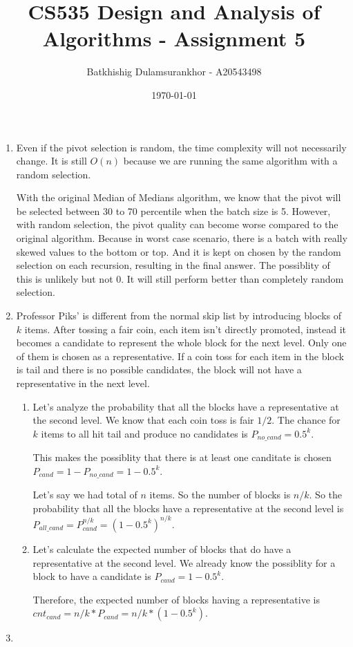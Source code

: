 \documentclass{article}
\title{CS535 Design and Analysis of Algorithms - Assignment 5}
\author{Batkhishig Dulamsurankhor - A20543498}
\date{\today} %
\begin{document}
\maketitle

\begin{enumerate}
  \item Even if the pivot selection is random, the time complexity will not necessarily change.
  It is still $O(n)$ because we are running the same algorithm with a random selection.

  With the original Median of Medians algorithm, we know that the pivot will be selected between 30 to 70 percentile when the batch size is 5.
  However, with random selection, the pivot quality can become worse compared to the original algorithm.
  Because in worst case scenario, there is a batch with really skewed values to the bottom or top.
  And it is kept on chosen by the random selection on each recursion, resulting in the final answer.
  The possiblity of this is unlikely but not 0.
  It will still perform better than completely random selection.

  \item Professor Piks' is different from the normal skip list by introducing blocks of $k$ items.
  After tossing a fair coin, each item isn't directly promoted, instead it becomes a candidate to represent the whole block for the next level.
  Only one of them is chosen as a representative.
  If a coin toss for each item in the block is tail and there is no possible candidates, the block will not have a representative in the next level.

  \begin{enumerate}
    \item Let's analyze the probability that all the blocks have a representative at the second level.
    We know that each coin toss is fair $1/2$.
    The chance for $k$ items to all hit tail and produce no candidates is $P_{no\_cand}=0.5^k$.
  
    This makes the possiblity that there is at least one canditate is chosen $P_{cand}=1-P_{no\_cand}=1-0.5^k$.
  
    Let's say we had total of $n$ items. So the number of blocks is $n/k$.
    So the probability that all the blocks have a representative at the second level is $P_{all\_cand}=P_{cand}^{n/k}=(1-0.5^k)^{n/k}$.

    \item Let's calculate the expected number of blocks that do have a representative at the second level.
    We already know the possiblity for a block to have a candidate is $P_{cand}=1-0.5^k$.

    Therefore, the expected number of blocks having a representative is $cnt_{cand}=n/k*P_{cand}=n/k*(1-0.5^k)$.
  \end{enumerate}
  
  \item

\end{enumerate}
\end{document}
